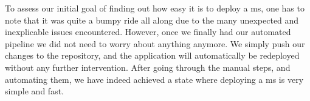 
To assess our initial goal of finding out how easy it is to deploy a
\gls{ms}, one has to note that it was quite a bumpy ride all along due
to the many unexpected and inexplicable issues encountered. However,
once we finally had our automated pipeline we did not need to worry
about anything anymore. We simply push our changes to the repository,
and the application will automatically be redeployed without any
further intervention. After going through the manual steps, and
automating them, we have indeed achieved a state where deploying a
\gls{ms} is very simple and fast.
